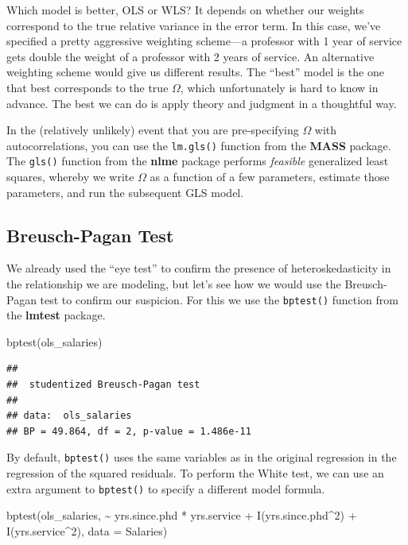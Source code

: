 \documentclass[
  12pt,
  oneside,openany]{book}
\newenvironment{Shaded}{\begin{snugshade}}{\end{snugshade}}
\newcommand{\AttributeTok}[1]{\textcolor[rgb]{0.77,0.63,0.00}{#1}}
\newcommand{\DecValTok}[1]{\textcolor[rgb]{0.00,0.00,0.81}{#1}}
\newcommand{\FunctionTok}[1]{\textcolor[rgb]{0.00,0.00,0.00}{#1}}
\newcommand{\NormalTok}[1]{#1}
\newcommand{\SpecialCharTok}[1]{\textcolor[rgb]{0.00,0.00,0.00}{#1}}
\begin{document}
Which model is better, OLS or WLS? It depends on whether our weights correspond to the true relative variance in the error term. In this case, we've specified a pretty aggressive weighting scheme---a professor with 1 year of service gets double the weight of a professor with 2 years of service. An alternative weighting scheme would give us different results. The ``best'' model is the one that best corresponds to the true \(\Omega\), which unfortunately is hard to know in advance. The best we can do is apply theory and judgment in a thoughtful way.

In the (relatively unlikely) event that you are pre-specifying \(\Omega\) with autocorrelations, you can use the \texttt{lm.gls()} function from the \textbf{MASS} package. The \texttt{gls()} function from the \textbf{nlme} package performs \emph{feasible} generalized least squares, whereby we write \(\Omega\) as a function of a few parameters, estimate those parameters, and run the subsequent GLS model.

\hypertarget{breusch-pagan-test}{%
\subsection{Breusch-Pagan Test}\label{breusch-pagan-test}}

We already used the ``eye test'' to confirm the presence of heteroskedasticity in the relationship we are modeling, but let's see how we would use the Breusch-Pagan test to confirm our suspicion. For this we use the \texttt{bptest()} function from the \textbf{lmtest} package.

\begin{Shaded}
\begin{Highlighting}[]
\FunctionTok{bptest}\NormalTok{(ols\_salaries)}
\end{Highlighting}
\end{Shaded}

\begin{verbatim}
## 
##  studentized Breusch-Pagan test
## 
## data:  ols_salaries
## BP = 49.864, df = 2, p-value = 1.486e-11
\end{verbatim}

By default, \texttt{bptest()} uses the same variables as in the original regression in the regression of the squared residuals. To perform the White test, we can use an extra argument to \texttt{bptest()} to specify a different model formula.

\begin{Shaded}
\begin{Highlighting}[]
\FunctionTok{bptest}\NormalTok{(ols\_salaries,}
       \SpecialCharTok{\textasciitilde{}}\NormalTok{ yrs.since.phd }\SpecialCharTok{*}\NormalTok{ yrs.service }\SpecialCharTok{+} \FunctionTok{I}\NormalTok{(yrs.since.phd}\SpecialCharTok{\^{}}\DecValTok{2}\NormalTok{) }\SpecialCharTok{+} \FunctionTok{I}\NormalTok{(yrs.service}\SpecialCharTok{\^{}}\DecValTok{2}\NormalTok{),}
       \AttributeTok{data =}\NormalTok{ Salaries)}
\end{Highlighting}
\end{Shaded}
\end{document}
